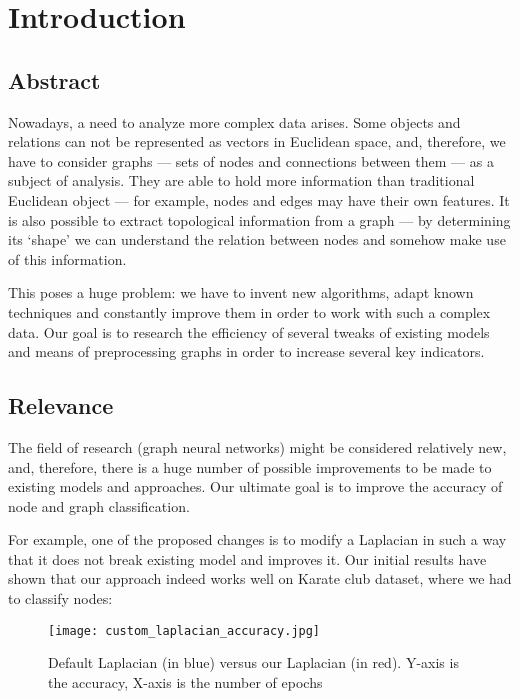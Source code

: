 \section{Introduction}

\subsection{Abstract}
    Nowadays, a need to analyze more complex data arises.
    Some objects and relations can not be represented as vectors in Euclidean space, and, therefore, we have to consider graphs --- sets of nodes and connections between them --- as a subject of analysis.
    They are able to hold more information than traditional Euclidean object --- for example, nodes and edges may have their own features.
    It is also possible to extract topological information from a graph --- by determining its `shape' we can understand the relation between nodes and somehow make use of this information.

    This poses a huge problem: we have to invent new algorithms, adapt known techniques and constantly improve them in order to work with such a complex data.
    Our goal is to research the efficiency of several tweaks of existing models and means of preprocessing graphs in order to increase several key indicators. 
    
\subsection{Relevance}
    The field of research (graph neural networks) might be considered relatively new, and, therefore, there is a huge number of possible improvements to be made to existing models and approaches.
    Our ultimate goal is to improve the accuracy of node and graph classification.

    For example, one of the proposed changes is to modify a Laplacian in such a way that it does not break existing model and improves it.
    Our initial results have shown that our approach indeed works well on Karate club dataset, where we had to classify nodes:

    \begin{figure}[h]
        \centering
        \texttt{[image: custom\_laplacian\_accuracy.jpg]}
        \caption{Default Laplacian (in blue) versus our Laplacian (in red). Y-axis is the accuracy, X-axis is the number of epochs}
    \end{figure}

